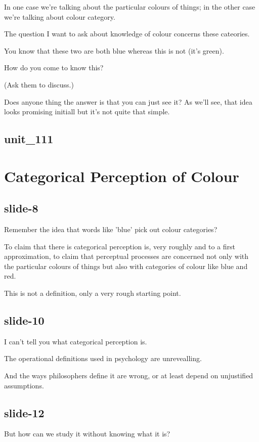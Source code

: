 \documentclass[12pt,\papersize]{extarticle}
\begin{document}
In one case we're talking about the particular colours of things; in the other case we're talking about colour category.
 
 
 
The question I want to ask about knowledge of colour concerns these cateories.
 
You know that these two are both blue whereas this is not (it's green).
 
How do you come to know this?
 
(Ask them to discuss.)
 
Does anyone thing the answer is that you can just see it?  As we'll see, that idea looks promising initiall but it's not quite that simple.
 
\subsection{unit\_111}
 
 
\section{Categorical Perception of Colour}
 
\subsection{slide-8}
Remember the idea that words like 'blue' pick out colour categories?
 
To claim that there is categorical perception is, very roughly and to a first approximation, to claim that perceptual processes are concerned not only with the particular colours of things but also with categories of colour like blue and red.
 
This is not a definition, only a very rough starting point.
 
\subsection{slide-10}
I can't tell you what categorical perception is.
 
The operational definitions used in psychology are unrevealling.
 
And the ways philosophers define it are wrong, or at least depend on unjustified assumptions.
 
\subsection{slide-12}
But how can we study it without knowing what it is?
 
\end{document}
